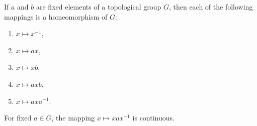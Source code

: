 If $a$ and $b$ are fixed elements of a topological group $G$, then each of the following mappings is a homeomorphism of $G$:
\begin{enumerate}
\item[(1)] $x \mapsto x^{-1}$,
\item[(2)] $x \mapsto ax$,
\item[(3)] $x \mapsto xb$,
\item[(4)] $x \mapsto axb$,
\item[(5)] $x \mapsto axa^{-1}$.
\end{enumerate}
For fixed $a \in G$, the mapping $x \mapsto xax^{-1}$ is continuous.
